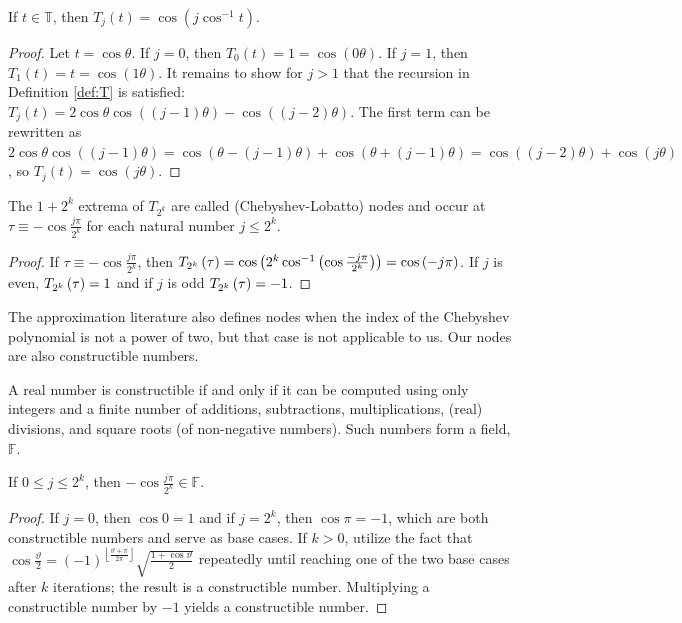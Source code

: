 \begin{lemma}[]
  \label{lem:trigonometric}
  \leanok
  If $t \in \mathbb{T}$, then $T_j\left(t\right) = \cos\left(j \cos^{-1}t\right)$.
\end{lemma}
  
\begin{proof}
  \leanok
  Let $t = \cos \theta$. If $j = 0$, then $T_0\left(t\right) = 1 = \cos\left(0 \theta\right)$. If $j = 1$, then $T_1\left(t\right) = t = \cos\left(1 \theta\right)$. It remains to show for $j > 1$ that the recursion in Definition \ref{def:T} is satisfied: $T_j\left(t\right) = 2 \cos \theta \cos\left(\left(j - 1\right) \theta\right) - \cos\left(\left(j - 2\right) \theta\right)$. The first term can be rewritten as $2\cos \theta \cos\left(\left(j - 1\right) \theta\right) = \cos\left(\theta - \left(j - 1\right)\theta\right) + \cos\left(\theta + \left(j - 1\right)\theta\right) = \cos\left(\left(j - 2\right)\theta\right) + \cos\left(j \theta\right)$, so $T_j\left(t\right) = \cos\left(j \theta\right)$.
\end{proof}

\begin{lemma}
  \label{lem:nodes}
  \leanok
  The $1 + 2^k$ extrema of $T_{2^k}$ are called (Chebyshev-Lobatto) nodes and occur at $\tau \equiv -\cos\frac{j\pi}{2^k}$ for each natural number $j \leq 2^k$.
\end{lemma}
\begin{proof}
  \leanok
  If $\tau \equiv -\cos\frac{j\pi}{2^k}$, then $T_{2^{k}}\left(\tau\right) = \cos\left(2^k \cos^{-1}\left(\cos \frac{-j\pi}{2^k}\right)\right) = \cos\left(-j\pi\right)$. If $j$ is even, $T_{2^{k}}\left(\tau\right) = 1$ and if $j$ is odd $T_{2^{k}}\left(\tau\right) = -1$.
\end{proof}
The approximation literature also defines nodes when the index of the Chebyshev polynomial is not a power of two, but that case is not applicable to us. Our nodes are also constructible numbers.
\begin{definition}
  A real number is constructible if and only if it can be computed using only integers and a finite number of additions, subtractions, multiplications, (real) divisions, and square roots (of non-negative numbers). Such numbers form a field, $\mathbb{F}$.
\end{definition}
\begin{lemma}
  \label{lem:constructible}
  \leanok
  If $0 \leq j \leq 2^k$, then $-\cos\frac{j\pi}{2^k} \in \mathbb{F}$.
\end{lemma}
\begin{proof}
   \leanok
   If $j = 0$, then $\cos 0 = 1$ and if $j = 2^k$, then $\cos \pi = -1$, which are both constructible numbers and serve as base cases. If $k > 0$, utilize the fact that $\cos\frac{\vartheta}{2} = \left(-1\right)^{\left\lfloor \frac{\vartheta + \pi}{2\pi} \right\rfloor} \sqrt{\frac{1 + \cos \vartheta}{2}}$ repeatedly until reaching one of the two base cases after $k$ iterations; the result is a constructible number. Multiplying a constructible number by $-1$ yields a constructible number.
\end{proof}

